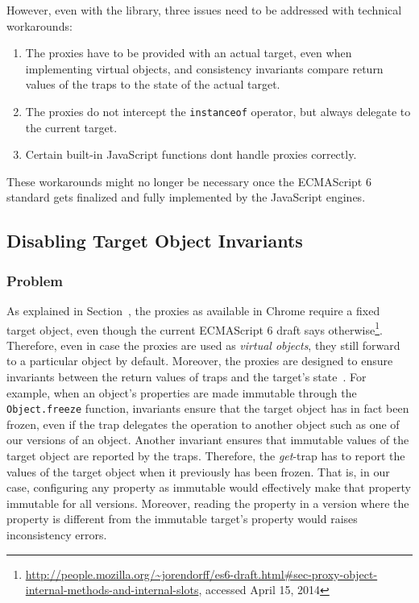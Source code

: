 However, even with the library, three issues need to be addressed with technical workarounds:

\begin{enumerate}
    \item The proxies have to be provided with an actual target, even when implementing virtual objects, and consistency invariants compare return values of the traps to the state of the actual target. 
    \item The proxies do not intercept the \lstinline{instanceof} operator, but always delegate to the current target.
    \item Certain built-in JavaScript functions dont handle proxies correctly.
\end{enumerate}

These workarounds might no longer be necessary once the ECMAScript 6 standard gets finalized and fully implemented by the JavaScript engines. 


\subsection{Disabling Target Object Invariants}


\subsubsection{Problem}
As explained in Section~\label{subsec:IMPLEMENTATION:1.1}, the proxies as available in Chrome require a fixed target object, even though the current ECMAScript 6 draft says otherwise\footnote{\url{http://people.mozilla.org/~jorendorff/es6-draft.html\#sec-proxy-object-internal-methods-and-internal-slots}, accessed April 15, 2014}.
Therefore, even in case the proxies are used as \emph{virtual objects}, they still forward to a particular object by default.
Moreover, the proxies are designed to ensure invariants between the return values of traps and the target's state~\cite{Cutsem2013TRP}.
For example, when an object's properties are made immutable through the \lstinline{Object.freeze} function, invariants ensure that the target object has in fact been frozen, even if the trap delegates the operation to another object such as one of our versions of an object.
Another invariant ensures that immutable values of the target object are reported by the traps.
Therefore, the \emph{get}-trap has to report the values of the target object when it previously has been frozen.
That is, in our case, configuring any property as immutable would effectively make that property immutable for all versions.
Moreover, reading the property in a version where the property is different from the immutable target's property would raises inconsistency errors.

